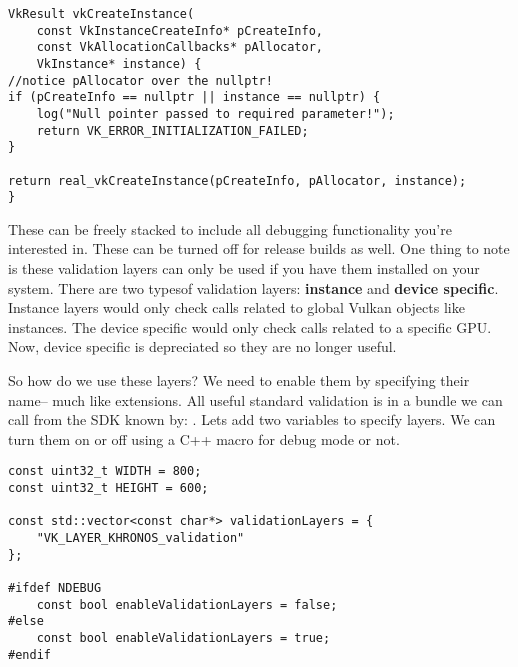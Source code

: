 \begin{center}
    \begin{minipage}{0.95\linewidth}
\begin{lstlisting}
VkResult vkCreateInstance(
    const VkInstanceCreateInfo* pCreateInfo,
    const VkAllocationCallbacks* pAllocator,
    VkInstance* instance) {
//notice pAllocator over the nullptr!
if (pCreateInfo == nullptr || instance == nullptr) {
    log("Null pointer passed to required parameter!");
    return VK_ERROR_INITIALIZATION_FAILED;
}

return real_vkCreateInstance(pCreateInfo, pAllocator, instance);
}
\end{lstlisting}
\end{minipage}
\end{center}

\par These can be freely stacked to include all debugging functionality you're interested in. These can be turned off for release builds as well. One thing to note is these validation layers can only be used if you have them installed on your system. There are two typesof validation layers: \textbf{instance} and \textbf{device specific}. Instance layers would only check calls related to global Vulkan objects like instances. The device specific would only check calls related to a specific GPU. Now, device specific is depreciated so they are no longer useful.

\par So how do we use these layers? We need to enable them by specifying their name-- much like extensions. All useful standard validation is in a bundle we can call from the SDK known by: . Lets add two variables to specify layers. We can turn them on or off using a C++ macro for debug mode or not.

\begin{center}
    \begin{minipage}{0.95\linewidth}
\begin{lstlisting}
const uint32_t WIDTH = 800;
const uint32_t HEIGHT = 600;

const std::vector<const char*> validationLayers = {
    "VK_LAYER_KHRONOS_validation"
};

#ifdef NDEBUG
    const bool enableValidationLayers = false;
#else
    const bool enableValidationLayers = true;
#endif
\end{lstlisting}
\end{minipage}
\end{center}

